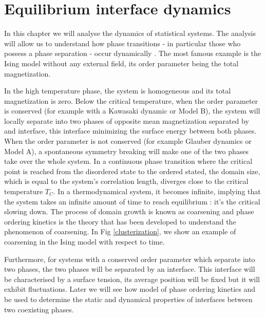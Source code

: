 \chapter{Equilibrium interface dynamics}
\label{chap-int-dyn}


In this chapter we will analyse the dynamics of statistical systems. The analysis will allow us to understand how phase transitions - in particular those who possess a phase separation - occur dynamically \cite{hohenberg_theory_1977}. The most famous example is the Ising model without any external field, its order parameter being the total magnetization. 

In the high temperature phase, the system is homogeneous and its total magnetization is zero. Below the critical temperature, when the order parameter is conserved (for example with a Kawasaki dynamic or Model B), the system will locally separate into two phases of opposite mean magnetization separated by and interface, this interface minimizing the surface energy between both phases.
When the order parameter is not conserved (for example Glauber dynamics or Model A), a spontaneous symmetry breaking will make one of the two phases take over the whole system. In a continuous phase transition where the critical point is reached from the disordered state to the ordered stated, the domain size, which is equal to the system's correlation length, diverges close to the critical temperature $T_C$. In a thermodynamical system, it becomes infinite, implying that the system takes an infinite amount of time to reach equilibrium : it's the critical slowing down. The process of domain growth is known as coarsening and phase ordering kinetics is the theory that has been developed to understand the phenomenon of coarsening\cite{bray_theory_1994}.  In Fig \ref{clusterization}, we show an example of coarsening in the Ising model with respect to time.

Furthermore, for systems with a conserved order parameter which separate into two phases, the two phases will be separated by an interface. This interface will be characterised by a surface tension, its average position will be fixed but it will exhibit fluctuations. Later we will see how model of phase ordering kinetics and be used to determine the static and dynamical properties of interfaces between two coexisting phases. 

